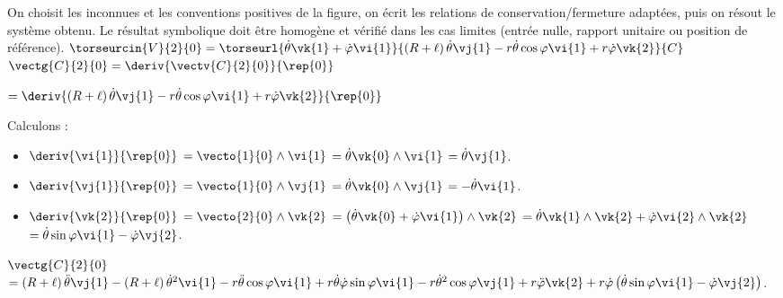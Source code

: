 \begin{corrigebox}
On choisit les inconnues et les conventions positives de la figure,
        on écrit les relations de conservation/fermeture adaptées, puis on résout le
        système obtenu. Le résultat symbolique doit être homogène et vérifié dans les cas
        limites (entrée nulle, rapport unitaire ou position de référence).
$\torseurcin{V}{2}{0} = \torseurl{\dot{\theta}\vk{1}+ \dot{\varphi}\vi{1}}{\left(R+\ell\right)\dot{\theta}\vj{1} -r\dot{\theta}\cos\varphi \vi{1} + r\dot{\varphi}\vk{2}}{C}$
$\vectg{C}{2}{0} = \deriv{\vectv{C}{2}{0}}{\rep{0}}$
 
 $ = \deriv{\left(R+\ell\right)\dot{\theta}\vj{1} -r\dot{\theta}\cos\varphi \vi{1} + r\dot{\varphi}\vk{2}}{\rep{0}}$
 
 Calculons : 
\begin{itemize}
\item $\deriv{\vi{1}}{\rep{0}}$ $=\vecto{1}{0} \wedge \vi{1}$ $=\dot{\theta}\vk{0} \wedge \vi{1}$ $=\dot{\theta}\vj{1}$.
\item $\deriv{\vj{1}}{\rep{0}}$ $=\vecto{1}{0} \wedge \vj{1}$ $=\dot{\theta}\vk{0} \wedge \vj{1}$ $=-\dot{\theta}\vi{1}$.
\item $\deriv{\vk{2}}{\rep{0}}$ $=\vecto{2}{0} \wedge \vk{2}$ 
$=\left(\dot{\theta}\vk{0}+ \dot{\varphi}\vi{1} \right) \wedge \vk{2}$
$=\dot{\theta}\vk{1} \wedge \vk{2}+ \dot{\varphi}\vi{2}  \wedge \vk{2}$
$=\dot{\theta}\sin\varphi\vi{1}- \dot{\varphi}\vj{2}$.
\end{itemize}

$\vectg{C}{2}{0}$ 
$ =\left(R+\ell\right)\ddot{\theta}\vj{1} -\left(R+\ell\right)\dot{\theta}^2\vi{1} 
-r\ddot{\theta}\cos\varphi \vi{1} +r\dot{\theta}\dot{\varphi}\sin\varphi \vi{1} -r\dot{\theta}^2\cos\varphi \vj{1} 
+ r\ddot{\varphi}\vk{2}+ r\dot{\varphi}\left(\dot{\theta}\sin\varphi\vi{1}- \dot{\varphi}\vj{2} \right)$.
\end{corrigebox}
